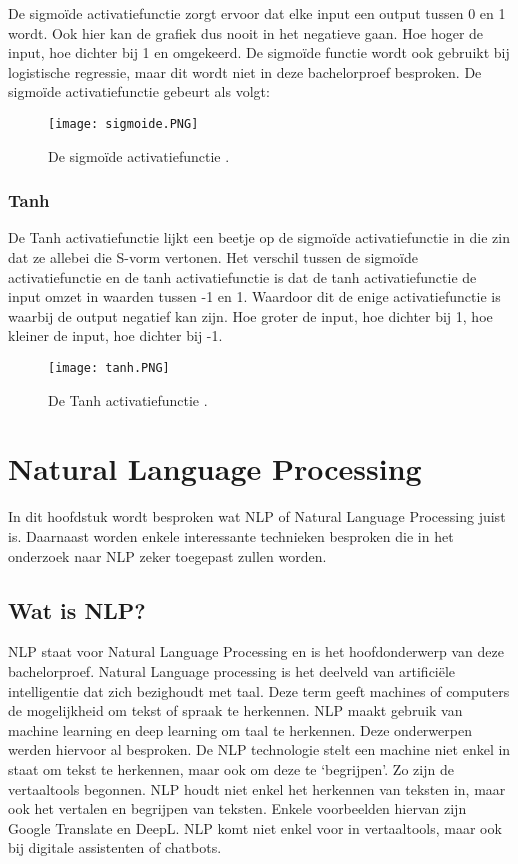 De sigmoïde activatiefunctie zorgt ervoor dat elke input een output tussen 0 en 1 wordt. Ook hier kan de grafiek dus nooit in het negatieve gaan. Hoe hoger de input, hoe dichter bij 1 en omgekeerd. De sigmoïde functie wordt ook gebruikt bij logistische regressie, maar dit wordt niet in deze bachelorproef besproken. \autocite{Brownlee2021} De sigmoïde activatiefunctie gebeurt als volgt:

\begin{figure}[!htbp]
    \texttt{[image: sigmoide.PNG]}
    \caption{\label{sigmoide}De sigmoïde activatiefunctie \autocite{Brownlee2021}.}
\end{figure}
\FloatBarrier


\subsubsection{Tanh}
\label{sec:tanh}

De Tanh activatiefunctie lijkt een beetje op de sigmoïde activatiefunctie in die zin dat ze allebei die S-vorm vertonen. Het verschil tussen de sigmoïde activatiefunctie en de tanh activatiefunctie is dat de tanh activatiefunctie de input omzet in waarden tussen -1 en 1. Waardoor dit de enige activatiefunctie is waarbij de output negatief kan zijn. Hoe groter de input, hoe dichter bij 1, hoe kleiner de input, hoe dichter bij -1. \autocite{Brownlee2021}

\begin{figure}[!htbp]
    \texttt{[image: tanh.PNG]}
    \caption{\label{tanh}De Tanh activatiefunctie \autocite{Brownlee2021}.}
\end{figure}
\FloatBarrier


\section{Natural Language Processing}
\label{sec:NLP}

In dit hoofdstuk wordt besproken wat NLP of Natural Language Processing juist is. Daarnaast worden enkele interessante technieken besproken die in het onderzoek naar NLP zeker toegepast zullen worden. 

\subsection{Wat is NLP?}
\label{sec:WatisNLP}
NLP staat voor Natural Language Processing en is het hoofdonderwerp van deze bachelorproef. Natural Language processing is het deelveld van artificiële intelligentie dat zich bezighoudt met taal. Deze term geeft machines of computers de mogelijkheid om tekst of spraak te herkennen. NLP maakt gebruik van machine learning en deep learning om taal te herkennen. Deze onderwerpen werden hiervoor al besproken. De NLP technologie stelt een machine niet enkel in staat om tekst te herkennen, maar ook om deze te ‘begrijpen’. Zo zijn de vertaaltools begonnen. NLP houdt niet enkel het herkennen van teksten in, maar ook het vertalen en begrijpen van teksten. Enkele voorbeelden hiervan zijn Google Translate en DeepL. NLP komt niet enkel voor in vertaaltools, maar ook bij digitale assistenten of chatbots. \autocite{IBM2020}

